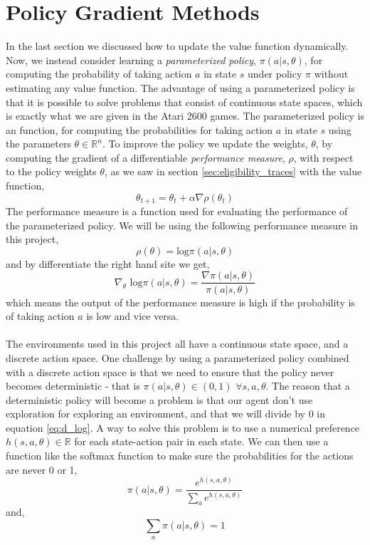 \documentclass[11pt]{article}
\begin{document}
\section{Policy Gradient Methods}

In the last section we discussed how to update the value function dynamically. Now, we instead consider learning a \textit{parameterized policy}, $\pi (a | s, \theta)$, for computing the probability of taking action $a$ in state $s$ under policy $\pi$ without estimating any value function. The advantage of using a parameterized policy is that it is possible to solve problems that consist of continuous state spaces\cite{policyGrad}, which is exactly what we are given in the Atari 2600 games. The parameterized policy is an function, for computing the probabilities for taking action $a$ in state $s$ using the parameters $\theta \in \mathbb{R}^{n}$. To improve the policy we update the weights, $\theta$, by computing the gradient of a differentiable \textit{performance measure}, $\rho$, with respect to the policy weights $\theta$, as we saw in section \ref{sec:eligibility_traces} with the value function, 
\begin{equation}
    \theta_{t + 1} = \theta_{t} + \alpha \nabla \rho (\theta_{t})
\end{equation}
The performance measure is a function used for evaluating the performance of the parameterized policy.
We will be using the following performance measure in this project,
\begin{equation}
    \rho(\theta) = \text{log} \pi (a | s, \theta)
\end{equation}
and by differentiate the right hand site we get,
\begin{equation}\label{eq:d_log}
    \nabla_{\theta} \text{ log} \pi (a | s, \theta) = \frac{\nabla \pi (a | s, \theta)}{ \pi (a | s, \theta)}
\end{equation}
which means the output of the performance measure is high if the probability is of taking action $a$ is low and vice versa.
\\ \\
The environments used in this project all have a continuous state space, and a discrete action space.
One challenge by using a parameterized policy combined with a discrete action space is that we need to ensure that the policy never becomes deterministic - that is $\pi (a|s,\theta) \in (0,1)$ $\forall s, a, \theta$. The reason that a deterministic policy will become a problem is that our agent don't use exploration for  exploring an environment, and that we will divide by 0 in equation \ref{eq:d_log}. A way to solve this problem is to use a numerical preference $h(s, a, \theta) \in \mathbb{R}$ for each state-action pair in each state. We can then use a function like the softmax function to make sure the probabilities for the actions are never 0 or 1,
\begin{equation}
    \pi(a | s, \theta) = \frac{e^{h(s,a,\theta)}}{\sum_{a} e^{h(s,a,\theta)}}
\end{equation}
and,
\begin{equation}
    \sum_{a} \pi (a | s, \theta) = 1
\end{equation}
\end{document}
